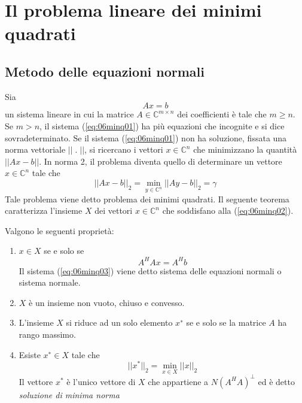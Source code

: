 


\inbpdocument 

\chapter{Il problema lineare dei minimi quadrati}

\section{Metodo delle equazioni normali}

Sia
\begin{equation}
  \label{eq:06minq01} Ax = b
\end{equation} 
un sistema lineare in cui la matrice $A \in \mathbb{C}^{m \times n}$ 
dei coefficienti \`e tale che $m \geq n$.  Se $m > n$, il sistema
(\ref{eq:06minq01}) ha pi\`u equazioni che incognite e si dice
sovradeterminato. Se il sistema (\ref{eq:06minq01}) non ha soluzione,
fissata una norma vettoriale $||\;.\;||$, si ricercano i vettori $x
\in \mathbb{C}^{n}$ che minimizzano la quantit\`a $||Ax − b||$.  In
norma 2, il problema diventa quello di determinare un vettore $x \in
\mathbb{C}^n$ tale che
 \begin{equation}
 \label{eq:06minq02} || Ax − b ||_{2} = \displaystyle \min_{y \in
\mathbb{C}^{n}} || Ay − b||_{2} = \gamma
 \end{equation} Tale problema viene detto problema dei minimi
quadrati.  Il seguente teorema caratterizza l'insieme $X$ dei vettori
$x \in \mathbb{C}^n$ che soddisfano alla (\ref{eq:06minq02}).

\begin{theo} Valgono le seguenti propriet\`a:
   \begin{enumerate}
   \item $x \in X$ se e solo se
     \begin{equation}
         \label{eq:06minq03} A^H Ax = A^Hb
     \end{equation} Il sistema (\ref{eq:06minq03}) viene detto sistema
delle equazioni normali o sistema normale.

\item $X$ \`e un insieme non vuoto, chiuso e convesso.

\item L'insieme $X$ si riduce ad un solo elemento $x^∗$ se e solo se
la matrice $A$ ha rango massimo.
\item Esiste $x^∗ \in X$ tale che
  \begin{equation}
\label{eq:06minq04} || x^{*}||_{2} = \displaystyle \min_{x \in X}
||x||_{2}
  \end{equation} Il vettore $x^{*}$ \`e l'unico vettore di $X$ che
appartiene a $N(A^{H}A)^{\bot}$ ed \`e detto \emph{soluzione di minima
norma}
   \end{enumerate}
\end{theo}

